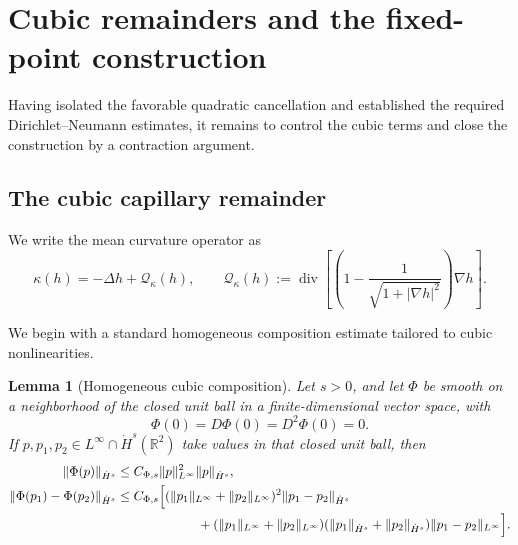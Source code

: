 \documentclass[12pt]{amsart}
\newtheorem{lemma}[theorem]{Lemma}
\theoremstyle{remark}
\theoremstyle{definition}
\numberwithin{equation}{section}
\newcommand{\R}{\mathbb{R}}
\begin{document}
\section{Cubic remainders and the fixed-point construction}
\label{s:capillary-fixed-point}

Having isolated the favorable quadratic cancellation and established the required Dirichlet--Neumann estimates, it remains to control the cubic terms and close the construction by a contraction argument.

\subsection{The cubic capillary remainder}

We write the mean curvature operator as
\begin{equation*}
 \kappa(h) = -\Delta h+\mathcal Q_\kappa(h), \qquad
 \mathcal Q_\kappa(h) := \operatorname{div} \left[ \left( 1-\frac1{\sqrt{1+|\nabla h|^2}} \right)\nabla h \right].
\end{equation*}

We begin with a standard homogeneous composition estimate tailored to
cubic nonlinearities.

\begin{lemma}[Homogeneous cubic composition]
\label{lem:homogeneous-cubic-composition}
Let \(s>0\), and let \(\Phi\) be smooth on a neighborhood of the closed
unit ball in a finite-dimensional vector space, with
\begin{equation} \label{PhiZero}
 \Phi(0)=D\Phi(0)=D^2\Phi(0)=0.
\end{equation}
If \(p,p_1,p_2\in L^\infty\cap\dot H^s(\R^2)\) take values in that closed
unit ball, then
\begin{align*}
 \|\Phi(p)\|_{\dot H^s} &\leq C_{\Phi,s}\|p\|_{L^\infty}^2\|p\|_{\dot H^s},\\
 \|\Phi(p_1)-\Phi(p_2)\|_{\dot H^s} &\leq C_{\Phi,s}\Bigl[ (\|p_1\|_{L^\infty}+\|p_2\|_{L^\infty})^2 \|p_1-p_2\|_{\dot H^s}\\
 &\hspace{22mm}
 +(\|p_1\|_{L^\infty}+\|p_2\|_{L^\infty})
 (\|p_1\|_{\dot H^s}+\|p_2\|_{\dot H^s})
 \|p_1-p_2\|_{L^\infty}\Bigr].
\end{align*}
\end{lemma}
\end{document}
